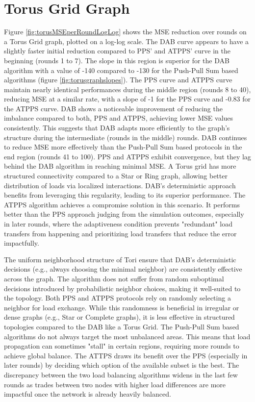 \section{Torus Grid Graph}\label{sec:torusgridGraph}
Figure \ref{fig:torusMSEperRoundLogLog} shows the MSE reduction over rounds on a Torus Grid graph, plotted on a log-log scale. The DAB curve appears to have a slightly faster initial reduction compared to PPS' and ATPPS' curve in the beginning (rounds 1 to 7). The slope in this region is superior for the DAB algorithm with a value of -140 compared to -130 for the Push-Pull Sum based algorithms (figure \ref{fig:torusgraphslopes}). The PPS curve and ATPPS curve maintain nearly identical performances during the middle region (rounds 8 to 40), reducing MSE at a similar rate, with a slope of -1 for the PPS curve and -0.83 for the ATPPS curve. DAB shows a noticeable improvement of reducing the imbalance compared to both, PPS and ATPPS, achieving lower MSE values consistently. This suggests that DAB adapts more efficiently to the graph's structure during the intermediate (rounds in the middle) rounds. DAB continues to reduce MSE more effectively than the Push-Pull Sum based protocols in the end region (rounds 41 to 100). PPS and ATPPS exhibit convergence, but they lag behind the DAB algorithm in reaching minimal MSE. A Torus grid has more structured connectivity compared to a Star or Ring graph, allowing better distribution of loads via localized interactions. DAB's deterministic approach benefits from leveraging this regularity, leading to its superior performance. The ATPPS algorithm achieves a compromise solution in this scenario. It performs better than the PPS approach judging from the simulation outcomes, especially in later rounds, where the adaptiveness condition prevents "redundant" load transfers from happening and prioritizing load transfers that reduce the error impactfully.

The uniform neighborhood structure of Tori ensure that DAB's deterministic decisions (e.g., always choosing the minimal neighbor) are consistently effective across the graph. The algorithm does not suffer from random suboptimal decisions introduced by probabilistic neighbor choices, making it well-suited to the topology. Both PPS and ATPPS protocols rely on randomly selecting a neighbor for load exchange. While this randomness is beneficial in irregular or dense graphs (e.g., Star or Complete graphs), it is less effective in structured topologies compared to the DAB like a Torus Grid. The Push-Pull Sum based algorithms do not always target the most unbalanced areas. This means that load propagation can sometimes "stall" in certain regions, requiring more rounds to achieve global balance. The ATTPS draws its benefit over the PPS (especially in later rounds) by deciding which option of the available subset is the best. The discrepancy between the two load balancing algorithms widens in the last few rounds as trades between two nodes with higher load differences are more impactful once the network is already heavily balanced.

